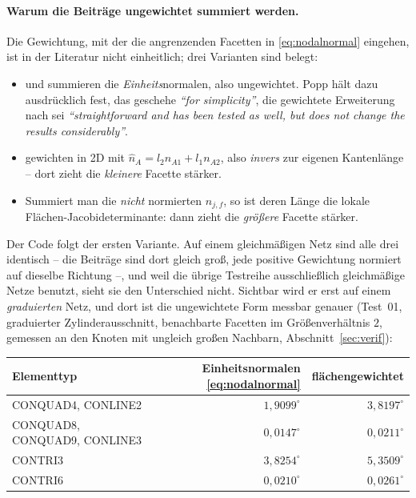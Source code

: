 \documentclass[a4paper,11pt]{article}
\def\bm#1{#1}%
\begin{document}
\paragraph{Warum die Beiträge ungewichtet summiert werden.}
Die Gewichtung, mit der die angrenzenden Facetten in \eqref{eq:nodalnormal} eingehen, ist in der
Literatur nicht einheitlich; drei Varianten sind belegt:
\begin{itemize}\itemsep2pt
  \item \citet[Gl.~(37)]{popp2010} und \citet[Gl.~(4.41)]{farah} summieren die
        \emph{Einheits}normalen, also ungewichtet. Popp hält dazu ausdrücklich fest, das geschehe
        \emph{``for simplicity''}, die gewichtete Erweiterung nach \citet{yangmeng2005} sei
        \emph{``straightforward and has been tested as well, but does not change the results
        considerably''}.
  \item \citet[Gl.~(51)]{yangmeng2005} gewichten in 2D mit $\hat{\bm n}_A = l_2\bm n_{A1} +
        l_1\bm n_{A2}$, also \emph{invers} zur eigenen Kantenlänge -- dort zieht die
        \emph{kleinere} Facette stärker.
  \item Summiert man die \emph{nicht} normierten $\bm n_{j,f}$, so ist deren Länge die lokale
        Flächen-Jacobideterminante: dann zieht die \emph{größere} Facette stärker.
\end{itemize}
Der Code folgt der ersten Variante. Auf einem gleichmäßigen Netz sind alle drei identisch -- die
Beiträge sind dort gleich groß, jede positive Gewichtung normiert auf dieselbe Richtung --, und
weil die übrige Testreihe ausschließlich gleichmäßige Netze benutzt, sieht sie den Unterschied
nicht. Sichtbar wird er erst auf einem \emph{graduierten} Netz, und dort ist die ungewichtete Form
messbar genauer (Test~01, graduierter Zylinderausschnitt, benachbarte Facetten im Größenverhältnis
$2$, gemessen an den Knoten mit ungleich großen Nachbarn, Abschnitt~\ref{sec:verif}):

\begin{center}
\small
\begin{tabular}{lrr}
\toprule
Elementtyp & Einheitsnormalen \eqref{eq:nodalnormal} & flächengewichtet \\
\midrule
CONQUAD4, CONLINE2            & $1{,}9099^\circ$  & $3{,}8197^\circ$ \\
CONQUAD8, CONQUAD9, CONLINE3  & $0{,}0147^\circ$  & $0{,}0211^\circ$ \\
CONTRI3                       & $3{,}8254^\circ$  & $5{,}3509^\circ$ \\
CONTRI6                       & $0{,}0210^\circ$  & $0{,}0261^\circ$ \\
\bottomrule
\end{tabular}
\end{center}
\end{document}
